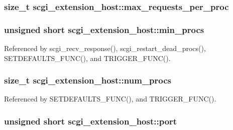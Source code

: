 \hypertarget{structscgi__extension__host_a554b32a3386e1a5dd9f3c1e35b6248af}{
\subsubsection[{max\-\_\-requests\-\_\-per\-\_\-proc}]{\setlength{\rightskip}{0pt plus 5cm}size\-\_\-t scgi\-\_\-extension\-\_\-host\-::max\-\_\-requests\-\_\-per\-\_\-proc}}\label{structscgi__extension__host_a554b32a3386e1a5dd9f3c1e35b6248af}
\hypertarget{structscgi__extension__host_a9965fe62e6e7ed80a052dfaf496a70ae}{
\subsubsection[{min\-\_\-procs}]{\setlength{\rightskip}{0pt plus 5cm}unsigned short scgi\-\_\-extension\-\_\-host\-::min\-\_\-procs}}\label{structscgi__extension__host_a9965fe62e6e7ed80a052dfaf496a70ae}


Referenced by scgi\-\_\-recv\-\_\-response(), scgi\-\_\-restart\-\_\-dead\-\_\-procs(), S\-E\-T\-D\-E\-F\-A\-U\-L\-T\-S\-\_\-\-F\-U\-N\-C(), and T\-R\-I\-G\-G\-E\-R\-\_\-\-F\-U\-N\-C().

\hypertarget{structscgi__extension__host_a31a57d075947d2f454eda8c476f44e21}{
\subsubsection[{num\-\_\-procs}]{\setlength{\rightskip}{0pt plus 5cm}size\-\_\-t scgi\-\_\-extension\-\_\-host\-::num\-\_\-procs}}\label{structscgi__extension__host_a31a57d075947d2f454eda8c476f44e21}


Referenced by S\-E\-T\-D\-E\-F\-A\-U\-L\-T\-S\-\_\-\-F\-U\-N\-C(), and T\-R\-I\-G\-G\-E\-R\-\_\-\-F\-U\-N\-C().

\hypertarget{structscgi__extension__host_ac00f564db00d88a8aab2c20fa23cb308}{
\subsubsection[{port}]{\setlength{\rightskip}{0pt plus 5cm}unsigned short scgi\-\_\-extension\-\_\-host\-::port}}\label{structscgi__extension__host_ac00f564db00d88a8aab2c20fa23cb308}



